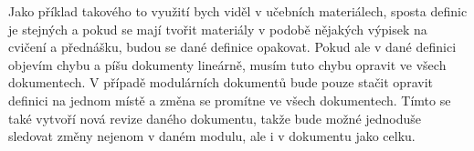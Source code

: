 Jako příklad takového to využití bych viděl v učebních materiálech, sposta definic je stejných a pokud se mají tvořit materiály v podobě nějakých výpisek na cvičení a přednášku,
budou se dané definice opakovat. Pokud ale v dané definici objevím chybu a píšu dokumenty lineárně, musím tuto chybu opravit ve všech dokumentech. V případě modulárních dokumentů
bude pouze stačit opravit definici na jednom místě a změna se promítne ve všech dokumentech. Tímto se také vytvoří nová revize daného dokumentu, takže bude možné jednoduše
sledovat změny nejenom v daném modulu, ale i v dokumentu jako celku.


\section{}